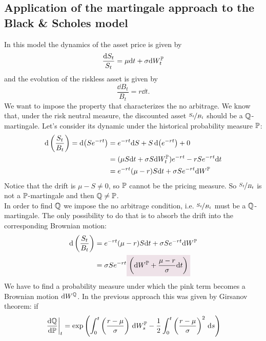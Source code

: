 \subsection[Application to the Black \& Scholes model]{Application of the martingale approach to the Black \& Scholes model}
In this model the dynamics of the asset price is given by
\begin{equation}\label{s}
    \dfrac{\dd S_t}{S_t} = \mu \dd t + \sigma \dd W_t^{\mathbb{P}}
\end{equation}
and the evolution of the riskless asset is given by
\begin{equation}
    \dfrac{\dd B_t}{B_t} = r \dd t.
\end{equation}
We want to impose the property that characterizes the no arbitrage. We know that, under the risk neutral measure, the discounted asset $\nicefrac{S_t}{B_t}$ should be a $\mathbb{Q}$-martingale. Let's consider its dynamic under the historical probability measure $\mathbb{P}$:
\begin{align}
    \dd\left(\frac{S_t}{B_t}\right) = \dd (Se^{-rt}) &= e^{-rt}\dd S + S\dd(e^{-rt}) + 0 \\
    &= 
    (\mu S \dd t + \sigma S \dd W_t^{\mathbb{P}})e^{-rt} - rSe^{-rt} \dd t \\
    &=
    e^{-rt}(\mu - r)S\dd t + \sigma Se^{-rt} \dd W^{\mathbb{P}}
\end{align}
Notice that the drift is $\mu-S\ne0$, so $\mathbb{P}$ cannot be the pricing measure. So $\nicefrac{S_t}{B_t}$ is not a $\mathbb{P}$-martingale and then $\mathbb{Q}\ne\mathbb{P}$. \\
In order to find $\mathbb{Q}$ we impose the no arbitrage condition, i.e. $\nicefrac{S_t}{B_t}$ must be a $\mathbb{Q}$-martingale. The only possibility to do that is to absorb the drift into the corresponding Brownian motion:
\begin{align}\label{drift}
    \notag \dd\left(\frac{S_t}{B_t}\right) &= e^{-rt}(\mu - r)S\dd t + \sigma Se^{-rt} \dd W^{\Pmeas}\\
    &=
    \sigma S e^{-rt}\hlc{mypink}{\left(\dd W^{\Pmeas} + \frac{\mu-r}{\sigma}\dd t\right)}
\end{align}
We have to find a probability measure under which the pink term becomes a Brownian motion $\dd W^{\mathbb{Q}}$. In the previous approach this was given by Girsanov theorem: if 
\begin{equation}\label{gis}
    \eval{\dv{\mathbb{Q}}{\mathbb{P}}}_t = \exp\left(\int^t_0 \left(\frac{r-\mu}{\sigma}\right)\,\dd W_s^{\mathbb{P}}-\dfrac{1}{2}\int^t_0 \left(\frac{r-\mu}{\sigma}\right)^2 \,\dd s\right)
\end{equation}
